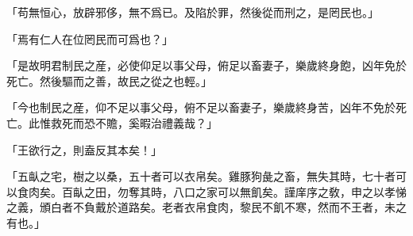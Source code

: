 「苟無恒心，放辟邪侈，無不爲已。及陷於罪，然後從而刑之，是罔民也。」

「焉有仁人在位罔民而可爲也？」

「是故明君制民之産，必使仰足以事父母，俯足以畜妻子，樂歲終身飽，凶年免於死亡。然後驅而之善，故民之從之也輕。」

「今也制民之産，仰不足以事父母，俯不足以畜妻子，樂歲終身苦，凶年不免於死亡。此惟救死而恐不贍，奚暇治禮義哉？」

「王欲行之，則盍反其本矣！」

「五畒之宅，樹之以桑，五十者可以衣帛矣。雞豚狗彘之畜，無失其時，七十者可以食肉矣。百畒之田，勿奪其時，八口之家可以無飢矣。謹庠序之敎，申之以孝悌之義，頒白者不負戴於道路矣。老者衣帛食肉，黎民不飢不寒，然而不王者，未之有也。」\par {}
